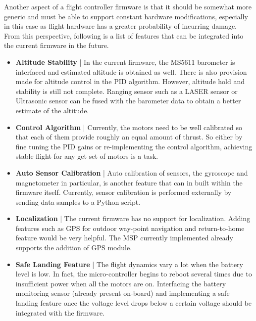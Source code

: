 \documentclass[a4paper,12pt,oneside]{book}
\begin{document}
Another aspect of a flight controller firmware is that it should be somewhat more generic and must be able to support constant hardware modifications, especially in this case as flight hardware has a greater probability of incurring damage. From this perspective, following is a list of features that can be integrated into the current firmware in the future.\\

\begin{itemize}
\item \textbf{Altitude Stability} | In the current firmware, the MS5611 barometer is interfaced and estimated altitude is obtained as well. There is also provision made for altitude control in the PID algorithm. However, altitude hold and stability is still not complete. Ranging sensor such as a LASER sensor or Ultrasonic sensor can be fused with the barometer data to obtain a better estimate of the altitude.\\

\item \textbf{Control Algorithm} | Currently, the motors need to be well calibrated so that each of them provide roughly an equal amount of thrust. So either by fine  tuning the PID gains or re-implementing the control algorithm, achieving stable flight for any get set of motors is a task.\\

\item \textbf{Auto Sensor Calibration} | Auto calibration of sensors, the gyroscope and magnetometer in particular, is another feature that can in built within the firmware itself. Currently, sensor calibration is performed externally by sending data samples to a Python script.

\item \textbf{Localization} | The current firmware has no support for localization. Adding features such as GPS for outdoor way-point navigation and return-to-home feature would be very helpful. The MSP currently implemented already supports the addition of GPS module.\\

\item \textbf{Safe Landing Feature} | The flight dynamics vary a lot when the battery level is low. In fact, the micro-controller begins to reboot several times due to insufficient power when all the motors are on. Interfacing the battery monitoring sensor (already present on-board) and implementing a safe landing feature once the voltage level drops below a certain voltage should be integrated with the firmware.\\


\end{itemize}
\end{document}
